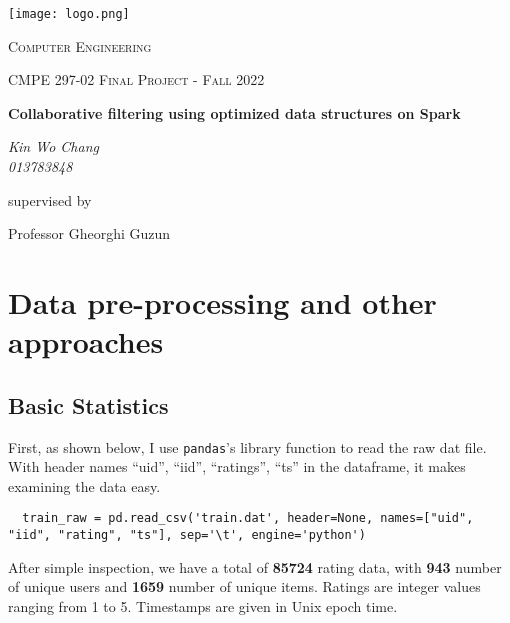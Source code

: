 \documentclass{scrartcl}
\begin{document}

\lstset{language=Python}
\begin{titlepage}
	\centering
	\texttt{[image: logo.png]}\par
	\vspace{2cm}
	{\scshape\LARGE Computer Engineering \par}  %
	\vspace{1cm}
	{\scshape\Large CMPE 297-02 Final Project - Fall 2022\par}
	\vfill
	
	{\huge\bfseries Collaborative filtering using optimized data structures on Spark \par}
	\vfill
	
	{\Large\itshape Kin Wo Chang \\ 013783848}\par
	\vspace{1.5cm}

	\vfill
	supervised by\par
	Professor Gheorghi Guzun


	\vfill
\end{titlepage}

\newpage

\doublespacing
\tableofcontents
\singlespacing

\newpage

\doublespacing

\section{Data pre-processing and other approaches}

\subsection{Basic Statistics}
First, as shown below, I use \texttt{pandas}'s library function to read the raw dat file. With header names ``uid'', ``iid'', ``ratings'', ``ts'' in the dataframe, it makes examining the data easy. \\
\begin{lstlisting}
  train_raw = pd.read_csv('train.dat', header=None, names=["uid", "iid", "rating", "ts"], sep='\t', engine='python')
\end{lstlisting}
After simple inspection, we have a total of \textbf{85724} rating data, with \textbf{943} number of unique users and \textbf{1659} number of unique items. Ratings are integer values ranging from 1 to 5. Timestamps are given in Unix epoch time.
\end{document}
